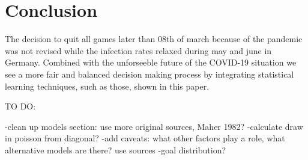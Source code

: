 \documentclass[12pt,a4paper]{article}
\begin{document}
\hypertarget{conclusion}{%
\section{Conclusion}\label{conclusion}}

The decision to quit all games later than 08th of march because of the
pandemic was not revised while the infection rates relaxed during may
and june in Germany. Combined with the unforseeble future of the
COVID-19 situation we see a more fair and balanced decision making
process by integrating statistical learning techniques, such as those,
shown in this paper.

TO DO:

-clean up models section: use more original sources, Maher 1982?
-calculate draw in poisson from diagonal? -add caveats: what other
factors play a role, what alternative models are there? use sources
-goal distribution?

\newpage

\printbibliography
\end{document}

